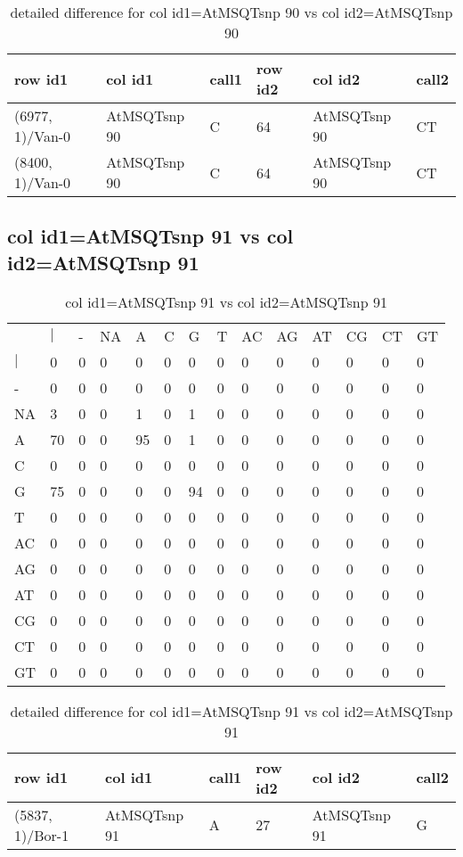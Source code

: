 \begin{center}
\begin{longtable}{|l|l|l|l|l|l|}
\caption{detailed difference for col id1=AtMSQTsnp 90 vs col id2=AtMSQTsnp 90} \label{table_dm973}\\
\hline
row id1&col id1&call1&row id2&col id2&call2\\
\hline
(6977, 1)/Van-0&AtMSQTsnp 90&C&64&AtMSQTsnp 90&CT\\
(8400, 1)/Van-0&AtMSQTsnp 90&C&64&AtMSQTsnp 90&CT\\
\hline
\end{longtable}
\end{center}

\subsection{col id1=AtMSQTsnp 91 vs col id2=AtMSQTsnp 91}
\begin{center}
\begin{longtable}{|l|l|l|l|l|l|l|l|l|l|l|l|l|l|}
\caption{col id1=AtMSQTsnp 91 vs col id2=AtMSQTsnp 91} \label{table_dm974}\\
\hline
\\
\hline
&$|$&-&NA&A&C&G&T&AC&AG&AT&CG&CT&GT\\
$|$&0&0&0&0&0&0&0&0&0&0&0&0&0\\
-&0&0&0&0&0&0&0&0&0&0&0&0&0\\
NA&3&0&0&1&0&1&0&0&0&0&0&0&0\\
A&70&0&0&95&0&1&0&0&0&0&0&0&0\\
C&0&0&0&0&0&0&0&0&0&0&0&0&0\\
G&75&0&0&0&0&94&0&0&0&0&0&0&0\\
T&0&0&0&0&0&0&0&0&0&0&0&0&0\\
AC&0&0&0&0&0&0&0&0&0&0&0&0&0\\
AG&0&0&0&0&0&0&0&0&0&0&0&0&0\\
AT&0&0&0&0&0&0&0&0&0&0&0&0&0\\
CG&0&0&0&0&0&0&0&0&0&0&0&0&0\\
CT&0&0&0&0&0&0&0&0&0&0&0&0&0\\
GT&0&0&0&0&0&0&0&0&0&0&0&0&0\\
\hline
\end{longtable}
\end{center}

\begin{center}
\begin{longtable}{|l|l|l|l|l|l|}
\caption{detailed difference for col id1=AtMSQTsnp 91 vs col id2=AtMSQTsnp 91} \label{table_dm975}\\
\hline
row id1&col id1&call1&row id2&col id2&call2\\
\hline
(5837, 1)/Bor-1&AtMSQTsnp 91&A&27&AtMSQTsnp 91&G\\
\hline
\end{longtable}
\end{center}

